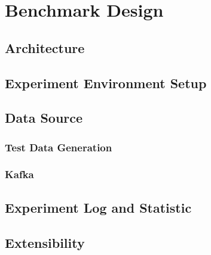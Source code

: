\chapter{Benchmark Design}

\section{Architecture}

\section{Experiment Environment Setup}

\section{Data Source}
\subsection{Test Data Generation}
\subsection{Kafka}

\section{Experiment Log and Statistic}

\section{Extensibility}

\clearpage